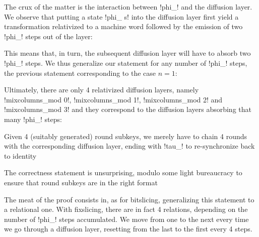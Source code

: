 \documentclass[draft,english]{jflart}
\begin{document}

The crux of the matter is the interaction between \coqe!phi_! and the
diffusion layer. We observe that putting a state \coqe!phi_ s! into
the diffusion layer first yield a transformation relativized to a
machine word followed by the emission of two \coqe!phi_! steps out of
the layer:
%
\begin{coro}
\end{coro}


This means that, in turn, the subsequent diffusion layer will have to
absorb two \coqe!phi_! steps. We thus generalize our statement for any
number of \coqe!phi_! steps, the previous statement corresponding to
the case $n = 1$:
%

Ultimately, there are only 4 relativized diffusion layers, namely
%
\coqe!mixcolumns_mod 0!,
%
\coqe!mixcolumns_mod 1!,
%
\coqe!mixcolumns_mod 2!
%
and
%
\coqe!mixcolumns_mod 3!
%
and they correspond to the diffusion layers absorbing that many
\coqe!phi_! steps:
%
\begin{prop}
\end{prop}



Given 4 (suitably generated) round subkeys, we merely have to chain 4
rounds with the corresponding diffusion layer, ending with \coqe!tau_!
to re-synchronize back to identity
%


The correctness statement is unsurprising, modulo some light
bureaucracy to ensure that round subkeys are in the right format
%
\begin{theo}
\end{theo}

The meat of the proof consists in, as for bitslicing, generalizing
this statement to a relational one. With fixslicing, there are in fact
4 relations, depending on the number of \coqe!phi_! steps accumulated.
We move from one to the next every time we go through a diffusion
layer, resetting from the last to the first every 4 steps.
\end{document}
